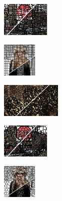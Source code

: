 \begin{figure}
\begin{subfigure}[b]{0.16\textwidth}
	\end{subfigure}
	\begin{subfigure}[b]{0.129\textwidth}
		\includegraphics[height=1.65cm]{pictures/sbd/tps/cropped/tps_6000067_contours}
	\end{subfigure}
	\begin{subfigure}[b]{0.10\textwidth}
		\includegraphics[height=1.65cm]{pictures/fash/tps/cropped/tps_132_contours}
	\end{subfigure}
	\begin{subfigure}[b]{0.02\textwidth}
	\end{subfigure}
	\begin{subfigure}[b]{0.16\textwidth}
		\includegraphics[height=1.65cm]{pictures/bsds500/vc/cropped/vc_208078_contours}
	\end{subfigure}
	\begin{subfigure}[b]{0.129\textwidth}
		\includegraphics[height=1.65cm]{pictures/sbd/vc/cropped/vc_6000067_contours}
	\end{subfigure}
	\begin{subfigure}[b]{0.10\textwidth}
		\includegraphics[height=1.65cm]{pictures/fash/vc/cropped/vc_132_contours}
	\end{subfigure}\\

\end{figure}
